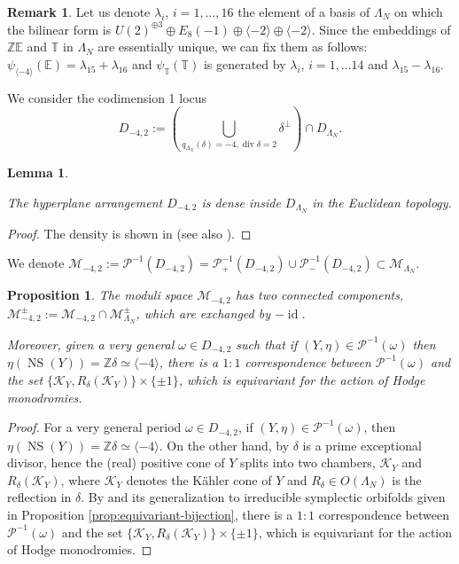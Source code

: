 \documentclass{amsart}
\newtheorem{lem}[thm]{Lemma}
\newtheorem{prop}[thm]{Proposition}
\theoremstyle{definition}
\newtheorem{rem}[thm]{Remark}
\numberwithin{equation}{section}
\numberwithin{equation}{section} \theoremstyle{definition}
\DeclareMathOperator{\NS}{NS}
\DeclareMathOperator{\id}{id}
\DeclareMathOperator{\divi}{div}
\begin{document}
\begin{rem}\label{rem: explicitl psi}{\rm Let us denote $\lambda_i$, $i=1,\ldots, 16$ the element of a basis of $\Lambda_N$ on which the bilinear form is $U(2)^{\oplus 3}\oplus E_8(-1)\oplus\langle -2\rangle\oplus \langle -2\rangle$. Since the embeddings of $\mathbb{Z}\mathbb{E}$ and $\mathbb{T}$ in $\Lambda_N$ are essentially unique, we can fix them as follows:
$\psi_{\langle-4\rangle}(\mathbb{E})=\lambda_{15}+\lambda_{16}$  and $\psi_{\mathbb{T}}(\mathbb{T})$ is generated by $\lambda_{i}$, $i=1,\ldots 14$ and $\lambda_{15}-\lambda_{16}$.}
\end{rem}
We  consider the codimension 1 locus
\[
D_{-4,2}:=(\bigcup_{q_{\Lambda_N}(\delta)=-4, \divi \delta=2}\delta^\perp)\cap D_{\Lambda_N}.
\]

\begin{lem}\label{lemma:density of periods of quotients}

The hyperplane arrangement $D_{-4,2}$ is dense inside $D_{\Lambda_N}$ in the Euclidean topology. 
\end{lem}
\begin{proof}
The density is shown in \cite[Proposition 3.2 and Remark 3.12]{AnaninVerbitsky} (see also \cite{MarkmanMehrotra}).
\end{proof}

We denote $\mathcal{M}_{-4,2}:=\mathcal{P}^{-1}(D_{-4,2})=\mathcal{P}_+^{-1}(D_{-4,2})\cup\mathcal{P}_-^{-1}(D_{-4,2})\subset \mathcal{M}_{\Lambda_N}$. 

\begin{prop}\label{prop:connected components of (-4,2) locus}
The moduli space $\mathcal{M}_{-4,2}$ has two connected components,  $\mathcal{M}_{-4,2}^\pm:=\mathcal{M}_{-4,2}\cap \mathcal{M}_{\Lambda_N}^\pm$, which are exchanged by $-\id$. 

Moreover, given a very general $\omega\in D_{-4,2}$ such that if $(Y,\eta)\in\mathcal{P}^{-1}(\omega)$ then $\eta(\NS(Y))=\mathbb{Z}\delta\simeq \langle -4\rangle$, there is a $1:1$ correspondence between $\mathcal{P}^{-1}(\omega)$ and the set $\{\mathcal{K}_Y, R_\delta(\mathcal{K}_Y)\}\times \{\pm 1\}$, which is equivariant for the action of Hodge monodromies. 
\end{prop}
\begin{proof}
For a very general period $\omega\in D_{-4,2}$, if $(Y,\eta)\in \mathcal{P}^{-1}(\omega)$, then $\eta(\NS(Y))=\mathbb{Z}\delta\simeq \langle -4\rangle$. On the other hand, by \cite{MenetRiess, BMM} $\delta$ is a prime exceptional divisor, hence the (real) positive cone of $Y$ splits into two chambers, $\mathcal{K}_Y$ and $R_\delta(\mathcal{K}_Y)$, where $\mathcal{K}_Y$ denotes the K\"ahler cone of $Y$ and $R_\delta\in O(\Lambda_N)$ is the reflection in $\delta$. By \cite[Thm 5.16]{MarkmanTorelli} and its generalization to irreducible symplectic orbifolds given in Proposition \ref{prop:equivariant-bijection}, there is a $1:1$ correspondence between $\mathcal{P}^{-1}(\omega)$ and the set $\{\mathcal{K}_Y, R_\delta(\mathcal{K}_Y)\}\times \{\pm 1\}$, which is equivariant for the action of Hodge monodromies. 
\end{proof}
\end{document}
